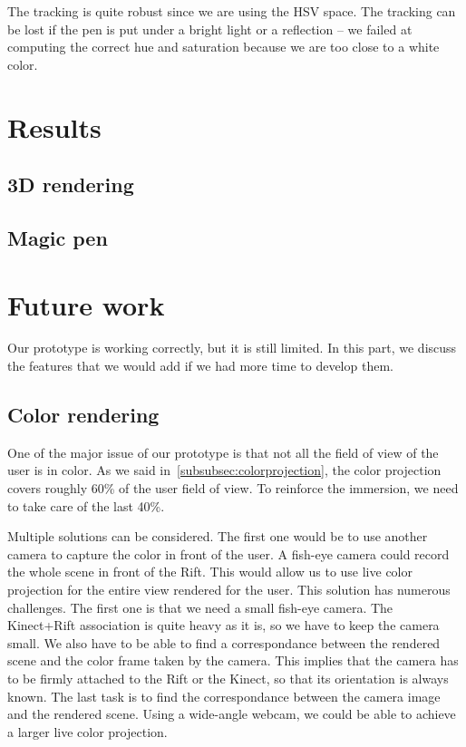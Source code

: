 \documentclass[12pt]{article}
\begin{document}
The tracking is quite robust since we are using the HSV space. The tracking can be lost if the pen is put under a bright light or a reflection -- we failed at computing the correct hue and saturation because we are too close to a white color.

\newpage
\section{Results}
\subsection{3D rendering}
\subsection{Magic pen}

\newpage
\section{Future work}
Our prototype is working correctly, but it is still limited. In this part, we discuss the features that we would add if we had more time to develop them.
\subsection{Color rendering}
One of the major issue of our prototype is that not all the field of view of the user is in color. As we said in~\ref{subsubsec:colorprojection}, the color projection covers roughly 60\% of the user field of view. To reinforce the immersion, we need to take care of the last 40\%.

Multiple solutions can be considered. The first one would be to use another camera to capture the color in front of the user. A fish-eye camera could record the whole scene in front of the Rift. This would allow us to use live color projection for the entire view rendered for the user. This solution has numerous challenges. The first one is that we need a small fish-eye camera. The Kinect+Rift association is quite heavy as it is, so we have to keep the camera small. We also have to be able to find a correspondance between the rendered scene and the color frame taken by the camera. This implies that the camera has to be firmly attached to the Rift or the Kinect, so that its orientation is always known. The last task is to find the correspondance between the camera image and the rendered scene. Using a wide-angle webcam, we could be able to achieve a larger live color projection.
\end{document}
